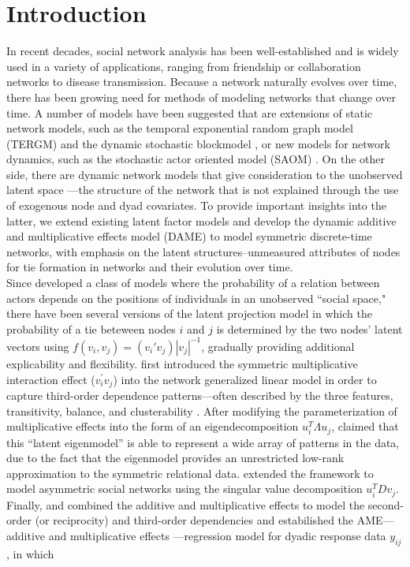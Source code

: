\documentclass[a4paper]{article}
\begin{document}
	\section{Introduction} \label{sec: Introduction}
	In recent decades, social network analysis has been well-established and is widely used in a variety of applications, ranging from friendship or collaboration networks to disease transmission.  Because a network naturally evolves over time, there has been growing need for methods of modeling networks that change over time. A number of models have been suggested that are extensions of static network models, such as the temporal exponential random graph model (TERGM) \citep{hanneke2010discrete} and the dynamic stochastic blockmodel \citep{xu2013dynamic}, or new models for network dynamics, such as the stochastic actor oriented model (SAOM) \citep{snijders2010introduction}. On the other side, there are dynamic network models that give consideration to the unobserved latent space \citep{hoff2002latent}---the structure of the network that is not explained through the use of exogenous node and dyad covariates. To provide important insights into the latter, we extend existing latent factor models \citep{hoff2005bilinear,hoff2009multiplicative,hoff2014amen,minhas2016inferential} and develop the dynamic additive and multiplicative effects model (DAME) to model symmetric discrete-time networks, with emphasis on the latent structures--unmeasured attributes of nodes for tie formation in networks and their evolution over time.\\ \newline
	Since \cite{hoff2002latent} developed a class of models where the probability of a relation between actors depends on the positions of individuals in an unobserved ``social space," there have been several versions of the latent projection model in which the probability of a tie beteween nodes $i$ and $j$ is determined by the two nodes' latent vectors using $f(v_i, v_j)={(v_i'v_j)}{|v_j|^{-1}}$, gradually providing additional explicability and flexibility. \cite{hoff2005bilinear} first introduced the symmetric multiplicative interaction effect ($v_i^\prime v_j$) into the network generalized linear model in order to capture third-order dependence patterns---often described by the three features, transitivity, balance, and clusterability \citep{hoff2005bilinear}. After modifying the parameterization of multiplicative effects into the form of an eigendecomposition $u_i^T\Lambda u_j$, \cite{hoff2008modeling} claimed that this ``latent eigenmodel'' is able to represent a wide array of patterns in the data, due to the fact that the eigenmodel provides an unrestricted low-rank approximation to the symmetric relational data. \cite{hoff2009multiplicative} extended the framework to model asymmetric social networks using the singular value decomposition $u_i^TDv_j$. Finally, \cite{hoff2014amen} and \cite{minhas2016inferential} combined the additive and multiplicative effects to model the second-order (or reciprocity) and third-order dependencies and estabilished the AME---additive and multiplicative effects ---regression model for dyadic response data $y_{ij}$, in which 
\end{document}
